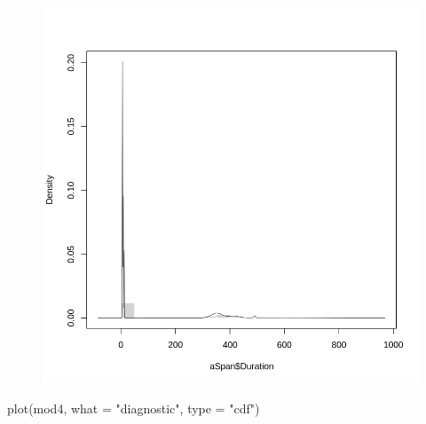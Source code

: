 \documentclass[
  letterpaper,
  DIV=11,
  numbers=noendperiod]{scrartcl}
\newenvironment{Shaded}{\begin{snugshade}}{\end{snugshade}}
\newcommand{\AttributeTok}[1]{\textcolor[rgb]{0.40,0.45,0.13}{#1}}
\newcommand{\FunctionTok}[1]{\textcolor[rgb]{0.28,0.35,0.67}{#1}}
\newcommand{\NormalTok}[1]{\textcolor[rgb]{0.00,0.23,0.31}{#1}}
\newcommand{\StringTok}[1]{\textcolor[rgb]{0.13,0.47,0.30}{#1}}
\begin{document}
\begin{figure}[H]

{\centering \includegraphics{dss-span-analysis-rev5_files/figure-pdf/cell-36-output-1.png}

}

\end{figure}

\begin{Shaded}
\begin{Highlighting}[]
\FunctionTok{plot}\NormalTok{(mod4, }\AttributeTok{what =} \StringTok{"diagnostic"}\NormalTok{, }\AttributeTok{type =} \StringTok{"cdf"}\NormalTok{)}
\end{Highlighting}
\end{Shaded}
\end{document}
